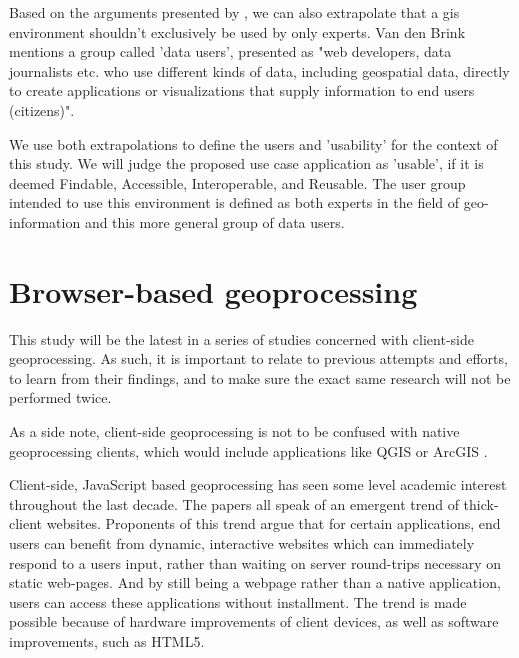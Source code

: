 Based on the arguments presented by \cite{brink_geospatial_2018}, we can also extrapolate that a \ac{gis} environment shouldn't exclusively be used by only experts. Van den Brink mentions a group called 'data users', presented as "web developers, data journalists etc. who use different kinds of data, including geospatial data, directly to create applications or visualizations that supply information to end users (citizens)". 

We use both extrapolations to define the users and 'usability' for the context of this study. We will judge the proposed use case application as 'usable', if it is deemed Findable, Accessible, Interoperable, and Reusable. The user group intended to use this environment is defined as both experts in the field of geo-information and this more general group of data users.


\section{Browser-based geoprocessing}


This study will be the latest in a series of studies concerned with client-side geoprocessing. As such, it is important to relate to previous attempts and efforts, to learn from their findings, and to make sure the exact same research will not be performed twice. 

As a side note, client-side geoprocessing is not to be confused with native geoprocessing clients, which would include applications like QGIS \cite{qgis_community_qgis_2022}or ArcGIS \cite{esri_arcgis_2022}. 

Client-side, JavaScript based geoprocessing has seen some level academic interest throughout the last decade. The papers \cite{hamilton_client-side_2014, panidi_hybrid_2015, kulawiak_analysis_2019} all speak of an emergent trend of thick-client websites. Proponents of this trend argue that for certain applications, end users can benefit from dynamic, interactive websites which can immediately respond to a users input, rather than waiting on server round-trips necessary on static web-pages. And by still being a webpage rather than a native application, users can access these applications without installment. The trend is made possible because of hardware improvements of client devices, as well as software improvements, such as HTML5. 

